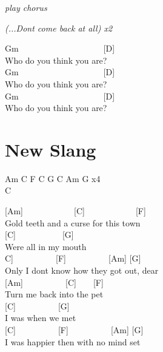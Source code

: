 \documentclass[
  letterpaper,
  a5paper]{memoir}
\begin{document}
\emph{play chorus}

\emph{(...Don\textquotesingle t come back at all) x2}

Gm~~~~~~~~~~~~~~~~~~~~{[}D{]}\\
Who do you think you are?\\
Gm~~~~~~~~~~~~~~~~~~~~{[}D{]}\\
Who do you think you are?\\
Gm~~~~~~~~~~~~~~~~~~~~{[}D{]}\\
Who do you think you are?

\hypertarget{new-slang}{%
\chapter{New Slang}\label{new-slang}}

Am C F C G C Am G x4\\
C

{[}Am{]}~~~~~~~~~~~~{[}C{]}~~~~~~~~~~~~{[}F{]}\\
Gold teeth and a curse for this town\\
{[}C{]}~~~~~~~~~~~{[}G{]}\\
Were all in my mouth\\
\hspace*{0.333em}\hspace*{0.333em}\hspace*{0.333em}\hspace*{0.333em}{[}C{]}~~~~~~~~~~{[}F{]}~~~~~~~~~~{[}Am{]}
{[}G{]}\\
Only I don\textquotesingle t know how they got out, dear\\
{[}Am{]}~~~~~~~~~~{[}C{]}~~~~{[}F{]}\\
Turn me back into the pet\\
{[}C{]}~~~~~~~~~~{[}G{]}\\
I was when we met\\
{[}C{]}~~~~~~~~~~{[}F{]}~~~~~~~~~~{[}Am{]} {[}G{]}\\
I was happier then with no mind set
\end{document}
